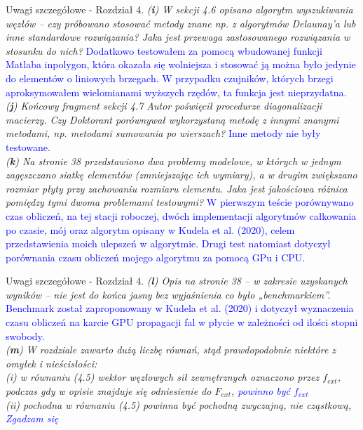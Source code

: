 \documentclass[10pt,aspectratio=169]{beamer} %
\begin{document}
\begin{frame}[label=frame4]{Uwagi szczegółowe - Rozdział 4.}\justifying
\textit{(\textbf{i}) W sekcji 4.6 opisano algorytm wyszukiwania węzłów – czy próbowano stosować metody znane np. z algorytmów Delaunay’a lub inne standardowe rozwiązania? Jaka 	jest przewaga zastosowanego rozwiązania w stosunku do nich?} \textcolor{blue}{Dodatkowo testowałem za pomocą wbudowanej funkcji Matlaba inpolygon, która okazała się wolniejsza i stosować ją można było jedynie do elementów o liniowych brzegach. W przypadku czujników, których brzegi aproksymowałem wielomianami wyższych rzędów, ta funkcja jest nieprzydatna.}\\ 
\textit{(\textbf{j}) Końcowy fragment sekcji 4.7 Autor poświęcił procedurze diagonalizacji macierzy. Czy Doktorant porównywał wykorzystaną metodę z innymi znanymi metodami, np.	metodami sumowania po wierszach?} \textcolor{blue}{Inne metody nie były testowane.}\\
\textit{(\textbf{k}) Na stronie 38 przedstawiono dwa problemy modelowe, w których w jednym zagęszczano siatkę elementów (zmniejszając ich wymiary), a w drugim zwiększano	rozmiar płyty przy zachowaniu rozmiaru elementu. Jaka jest jakościowa różnica pomiędzy tymi dwoma problemami testowymi?} \textcolor{blue} {W pierwszym teście porównywano czas obliczeń, na tej stacji roboczej, dwóch implementacji algorytmów całkowania po czasie, mój oraz algorytm opisany w Kudela et al. (2020), celem przedstawienia moich ulepszeń w algorytmie. Drugi test natomiast dotyczył porównania czasu obliczeń mojego algorytmu za pomocą GPu i CPU.}
\end{frame}
\begin{frame}[label=frame4]{Uwagi szczegółowe - Rozdział 4.}\justifying
\textit{(\textbf{l}) Opis na stronie 38 – w zakresie uzyskanych wyników – nie jest do końca jasny bez wyjaśnienia co było „benchmarkiem”.} \textcolor{blue}{Benchmark został zaproponowany w Kudela et al. (2020) i dotyczył wyznaczenia czasu obliczeń na karcie GPU propagacji fal w płycie w zależności od ilości stopni swobody.}\\
\textit{(\textbf{m}) W rozdziale zawarto dużą liczbę równań, stąd prawdopodobnie niektóre z omyłek i nieścisłości:\\
(i) w równaniu (4.5) wektor węzłowych sił zewnętrznych oznaczono przez \(f_{ext}\), podczas gdy w opisie znajduje się odniesienie do \(F_{ext}\), \textcolor{blue}{powinno być \(f_{ext}\)}\\
(ii) pochodna w równaniu (4.5) powinna być pochodną zwyczajną, nie cząstkową, \textcolor{blue}{Zgadzam się}}
\end{frame}
\end{document}
